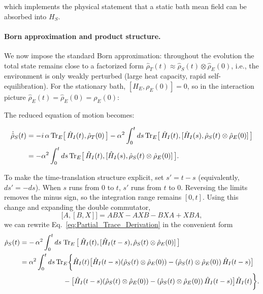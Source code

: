 \noindent
which implements the physical statement that a static bath mean field can be absorbed into $H_S$.

\paragraph{Born approximation and product structure.}

\noindent
We now impose the standard Born approximation: throughout the evolution the total state remains close to a factorized form $\hat{\rho}_T(t) \approx \hat{\rho}_S(t) \otimes \hat{\rho}_E(0)$, i.e., the environment is only weakly perturbed (large heat capacity, rapid self-equilibration). For the stationary bath, $[H_E, \rho_E(0)]=0$, so in the interaction picture $\hat{\rho}_E(t)=\hat{\rho}_E(0)=\rho_E(0)$:

\noindent
The reduced equation of motion becomes:

\begin{align}
	\dot{\hat{\rho}}_S(t) & = -i \, \alpha \, \mathrm{Tr}_E\big[\,\hat{H}_I(t),\hat{\rho}_T(0)\,\big]
	- \alpha^2 \int_0^t ds\, \mathrm{Tr}_E \big[\,\hat{H}_I(t), [\hat{H}_I(s), \hat{\rho}_S(t) \otimes \hat{\rho}_E(0)] \,\big] \notag                     \\
	                      & = - \alpha^2 \int_0^t ds\, \mathrm{Tr}_E \big[\,\hat{H}_I(t), [\hat{H}_I(s), \hat{\rho}_S(t) \otimes \hat{\rho}_E(0)] \,\big].
	\label{eq:Partial_Trace_Derivation}
\end{align}

\noindent
To make the time-translation structure explicit, set $s' = t-s$ (equivalently, $ds' = -ds$). When $s$ runs from $0$ to $t$, $s'$ runs from $t$ to $0$. Reversing the limits removes the minus sign, so the integration range remains $[0,t]$. Using this change and expanding the double commutator,
\begin{equation}
	\label{eq:double_comm_expansion_rule}
	\big[ A, [B, X] \big] = A B X - A X B - B X A + X B A,
\end{equation}
we can rewrite Eq.~\eqref{eq:Partial_Trace_Derivation} in the convenient form
\begin{align}
	\dot{\rho}_S(t) & = - \, \alpha^2 \int_0^t ds\; \mathrm{Tr}_E \, \big[\, \hat{H}_I(t), [\hat{H}_I(t-s), \hat{\rho}_S(t) \otimes \hat{\rho}_E(0)] \,\big] \notag                          \\
	                & = \alpha^2 \int_0^t ds \, \mathrm{Tr}_E \bigg\{
	\hat{H}_I(t) \big[ \hat{H}_I(t-s) (\hat{\rho}_S(t) \otimes \hat{\rho}_E(0)) - (\hat{\rho}_S(t) \otimes \hat{\rho}_E(0)) \, \hat{H}_I(t-s) \big] \notag                                   \\
	                & \qquad\qquad\qquad\; - \big[ \hat{H}_I(t-s) (\hat{\rho}_S(t) \otimes \hat{\rho}_E(0)) - (\hat{\rho}_S(t) \otimes \hat{\rho}_E(0)) \, \hat{H}_I(t-s) \big] \hat{H}_I(t)
	\bigg\}.
	\label{eq:Second_Order_Final_Expression}
\end{align}

